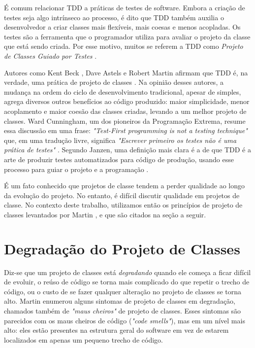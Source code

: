\documentclass[conference]{IEEEtran}
\begin{document}
É comum relacionar TDD a práticas de testes de software. 
Embora a criação de testes seja algo intrínseco ao processo, é dito que TDD também 
auxilia o desenvolvedor a criar classes mais flexíveis, mais coesas e
menos acopladas. Os testes são a ferramenta que o programador utiliza para
avaliar o projeto da classe que está sendo criada. 
Por esse motivo, muitos se referem a TDD como
\textit{Projeto de Classes Guiado por Testes} \cite{tdd-taxonomy}.

Autores como Kent Beck \cite{aim-fire}, Dave Astels \cite{astels-tdd} e
Robert Martin \cite{bob-martin} afirmam que TDD é, na verdade, uma prática de
projeto de classes \cite{tdd-taxonomy} \cite{aim-fire}.
Na opinião desses autores, a mudança na ordem do ciclo de
desenvolvimento tradicional, apesar de simples, agrega diversos outros
benefícios ao código produzido: maior simplicidade, menor acoplamento e maior
coesão das classes criadas, levando a um melhor projeto de classes. 
Ward Cunningham, um dos pioneiros da Programação Extrema, resume essa 
discussão em uma frase: \textit{"Test-First programming is not a testing technique"} 
que, em uma tradução livre, significa \textit{"Escrever primeiro os testes
não é uma prática de testes"} \cite{aim-fire}.
Segundo Janzen, uma definição mais clara é a de que TDD é a arte de produzir testes
automatizados para código de produção, usando esse processo para guiar o 
projeto e a programação \cite{agilealliance-tdd} \cite{tdd-taxonomy}.

É um fato conhecido que projetos de classe tendem a perder qualidade ao longo da evolução
do projeto. No entanto, é difícil discutir qualidade
em projetos de classe. No contexto deste trabalho, utilizamos então os princípios de projeto
de classes levantados por Martin \cite{bob-martin}, e que são citados na seção a seguir.

\section{Degradação do Projeto de Classes}

Diz-se que um projeto de classes está \textit{degradando}
quando ele começa a ficar difícil de evoluir, o reúso de código se 
torna mais complicado do que repetir o trecho de código, ou o custo de se fazer 
qualquer alteração no projeto de classes se torna alto.
Martin \cite{bob-martin} enumerou alguns sintomas de projeto de classes em degradação, 
chamados também de \textit{"maus cheiros"} de projeto de classes. Esses sintomas são parecidos com os 
maus cheiros de código (\textit{"code smells"}), mas em um nível mais alto: eles
estão presentes na estrutura geral do software em vez de estarem localizados
em apenas um pequeno trecho de código.
\end{document}
